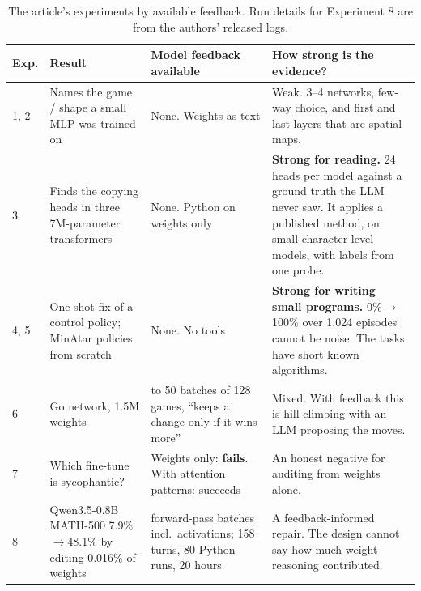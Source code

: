 \documentclass[10pt,a4paper]{article}
\newcommand{\up}{$\rightarrow$}
\begin{document}
\begin{table}[H]\small\centering
\begin{tabularx}{\textwidth}{@{}l>{\raggedright\arraybackslash}p{3.3cm}>{\raggedright\arraybackslash}p{3.6cm}>{\raggedright\arraybackslash}X@{}}
\toprule
Exp. & Result & Model feedback available & How strong is the evidence?\\
\midrule
1, 2 & Names the game / shape a small MLP was trained on & None. Weights as text & Weak. 3--4 networks, few-way choice, and first and last layers that are spatial maps.\\
3 & Finds the copying heads in three 7M-parameter transformers & None. Python on weights only & \textbf{Strong for reading.} 24 heads per model against a ground truth the LLM never saw. It applies a published method, on small character-level models, with labels from one probe.\\
4, 5 & One-shot fix of a control policy; MinAtar policies from scratch & None. No tools & \textbf{Strong for writing small programs.} 0\%\up100\% over 1,024 episodes cannot be noise. The tasks have short known algorithms.\\
6 & Go network, 1.5M weights & 0 to 50 batches of 128 games, ``keeps a change only if it wins more'' & Mixed. With feedback this is hill-climbing with an LLM proposing the moves.\\
7 & Which fine-tune is sycophantic? & Weights only: \textbf{fails}. With attention patterns: succeeds & An honest negative for auditing from weights alone.\\
8 & Qwen3.5-0.8B MATH-500 7.9\%\up48.1\% by editing 0.016\% of weights & 50 forward-pass batches incl.\ activations; 158 turns, 80 Python runs, 20 hours & A feedback-informed repair. The design cannot say how much weight reasoning contributed.\\
\bottomrule
\end{tabularx}
\caption{The article's experiments by available feedback. Run details for Experiment 8 are from the authors' released logs.}\label{tab:critique}
\end{table}
\end{document}
